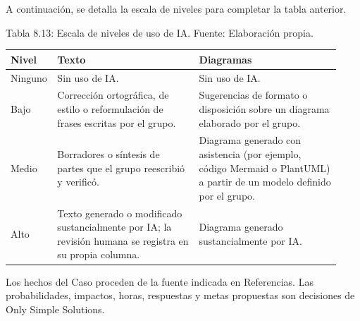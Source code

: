 \documentclass[11pt]{article}
\begin{document}
A continuación, se detalla la escala de niveles para completar la tabla anterior.

Tabla 8.13: Escala de niveles de uso de IA. Fuente: Elaboración propia.\label{tab:8-13}

\begin{tabular}{@{}p{0.069\linewidth}p{0.429\linewidth}p{0.429\linewidth}@{}}
\toprule Nivel & Texto & Diagramas \\
\midrule
Ninguno & Sin uso de IA. & Sin uso de IA. \\
Bajo & Corrección ortográfica, de estilo o reformulación de frases escritas por el grupo. & Sugerencias de formato o disposición sobre un diagrama elaborado por el grupo. \\
Medio & Borradores o síntesis de partes que el grupo reescribió y verificó. & Diagrama generado con asistencia (por ejemplo, código Mermaid o PlantUML) a partir de un modelo definido por el grupo. \\
Alto & Texto generado o modificado sustancialmente por IA; la revisión humana se registra en su propia columna. & Diagrama generado sustancialmente por IA. \\
\bottomrule
\end{tabular}

Los hechos del Caso proceden de la fuente indicada en Referencias. Las probabilidades, impactos, horas, respuestas y metas propuestas son decisiones de Only Simple Solutions.

\ossFinalPage
\end{document}
